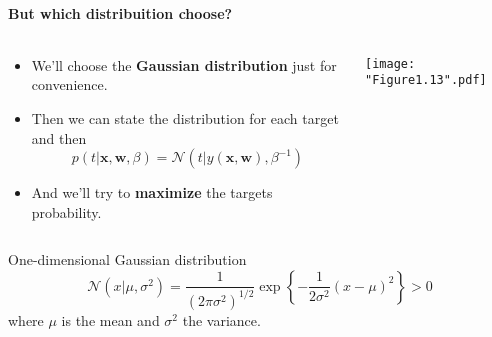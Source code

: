 \begin{frame}{\insertsubsection}
	\framesubtitle{But which distribuition choose?}
	\begin{columns}
		\begin{column}{0.475\textwidth}
			\begin{itemize}
				\item We'll choose the \textcolor{UniOrange}{\textbf{Gaussian distribution}} just for convenience.
				\item Then we can state the distribution for each target and then
				\begin{equation*}
					p( t| \mathbf{x}, \mathbf{w}, \beta) = \mathcal{N} \left( t | y(\mathbf{x}, \mathbf{w}), \beta^{-1} \right)
				\end{equation*}
				\item And we'll try to \textcolor{UniOrange}{\textbf{maximize}}	the targets probability.
			\end{itemize}
		\end{column}
		\begin{column}{0.475\textwidth}
			\texttt{[image: "Figure1.13".pdf]}
		\end{column}
	\end{columns}
	\begin{block}{One-dimensional Gaussian distribution}
		\begin{equation*}
			\mathcal{N}(x | \mu, \sigma^2) = \frac{1}{(2 \pi \sigma^2)^{1/2}} \exp \left\{ -\frac{1}{2 \sigma^2} (x- \mu)^2 \right\} > 0
		\end{equation*}
		where $\mu$ is the mean and $\sigma^2$ the variance.
	\end{block}	
\end{frame}

